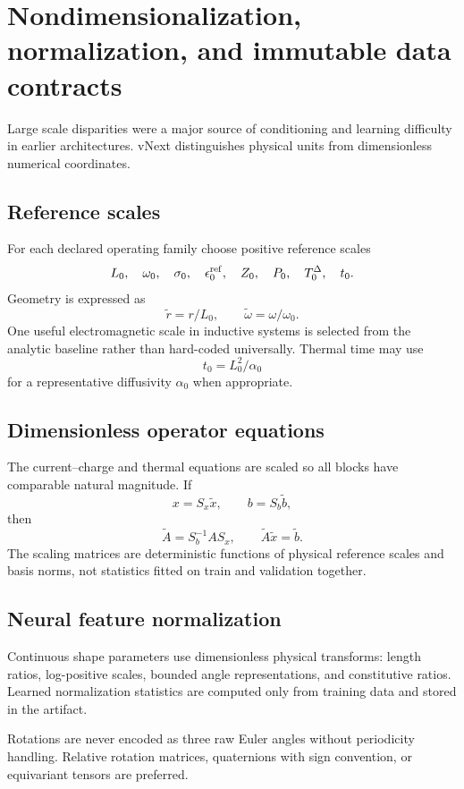 \section{Nondimensionalization, normalization, and immutable data contracts}
\label{sec:nondimensionalization}

Large scale disparities were a major source of conditioning and learning
difficulty in earlier architectures. vNext distinguishes physical units from
dimensionless numerical coordinates.

\subsection{Reference scales}

For each declared operating family choose positive reference scales
\[
 L_0,\quad \omega_0,\quad \sigma_0,\quad \epsilon_0^{\rm ref},
 \quad Z_0,\quad P_0,\quad T_0^{\Delta},\quad t_0 .
\]
Geometry is expressed as
\[
  \widetilde r=r/L_0,\qquad
  \widetilde\omega=\omega/\omega_0.
\]
One useful electromagnetic scale in inductive systems is selected from the
analytic baseline rather than hard-coded universally. Thermal time may use
\[
  t_0=L_0^2/\alpha_0
\]
for a representative diffusivity $\alpha_0$ when appropriate.

\subsection{Dimensionless operator equations}

The current--charge and thermal equations are scaled so all blocks have
comparable natural magnitude. If
\[
 x=S_x\widetilde x,\qquad
 b=S_b\widetilde b,
\]
then
\[
 \widetilde A
 =
 S_b^{-1}AS_x,\qquad
 \widetilde A\widetilde x=\widetilde b.
\]
The scaling matrices are deterministic functions of physical reference scales
and basis norms, not statistics fitted on train and validation together.

\subsection{Neural feature normalization}

Continuous shape parameters use dimensionless physical transforms:
length ratios, log-positive scales, bounded angle representations, and
constitutive ratios. Learned normalization statistics are computed only from
training data and stored in the artifact.

Rotations are never encoded as three raw Euler angles without periodicity
handling. Relative rotation matrices, quaternions with sign convention, or
equivariant tensors are preferred.

